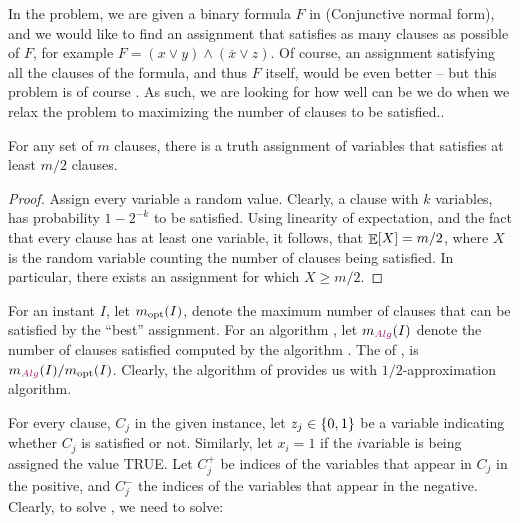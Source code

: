 In the  problem, we are given a binary formula $F$
in  (Conjunctive normal form), and we would like to
find an assignment that satisfies as many clauses as possible of $F$,
for example $F = (x\vee y) \wedge (\overline{x} \vee z)$. Of course,
an assignment satisfying all the clauses of the formula, and thus $F$
itself, would be even better -- but this problem is of course \NPC. As
such, we are looking for how well can be we do when we relax the
problem to maximizing the number of clauses to be satisfied..

\begin{theorem}
    For any set of $m$ clauses, there is a truth assignment
    of variables that satisfies at least $m/2$ clauses.

\end{theorem}

\begin{proof}
    Assign every variable a random value. Clearly, a clause with $k$
    variables, has probability $1-2^{-k}$ to be satisfied. Using
    linearity of expectation, and the fact that every clause has at
    least one variable, it follows, that $\mathop{\mathbb{E}}\!\left[ {X} \right] = m/2$, where $X$ is
    the random variable counting the number of clauses being
    satisfied.  In particular, there exists an assignment for which $X
    \geq m/2$.
\end{proof}



For an instant $I$, let $m_{\mathrm{opt}}(I)$, denote the maximum number of
clauses that can be satisfied by the ``best'' assignment. For an
algorithm \Alg, let $m_\Alg(I)$ denote the number of clauses satisfied
computed by the algorithm \Alg.  The  of
\Alg, is $m_\Alg(I)/\mopt(I)$.  Clearly, the algorithm of
 provides us with $1/2$-approximation algorithm.

For every clause, $C_j$ in the given instance, let $z_j \in \left\{ {0,1} \right\}$
be a variable indicating whether $C_j$ is satisfied or not. Similarly,
let $x_i=1$ if the $i$\th variable is being assigned the value
\textsc{TRUE}. Let $C_j^+$ be indices of the variables that appear in
$C_j$ in the positive, and $C_j^-$ the indices of the variables that
appear in the negative. Clearly, to solve , we need
to solve:


